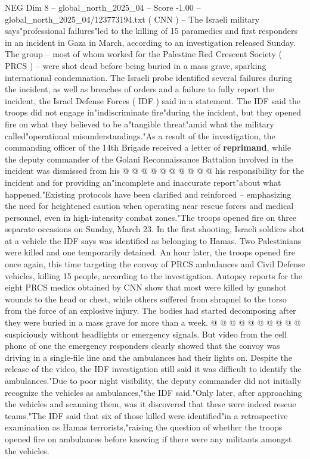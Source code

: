 \begin{textsample}{NEG Dim 8 – global\_north\_2025\_04 – Score -1.00 – global\_north\_2025\_04/123773194.txt}  \label{ex:f8_neg_423}
( CNN ) -- The Israeli military says"professional failures"led to the killing of 15 paramedics and first responders in an incident in Gaza in March, according to an investigation released Sunday.
The group -- most of whom worked for the Palestine Red Crescent Society ( PRCS ) -- were shot dead before being buried in a mass grave, sparking international condemnation.
The Israeli probe identified several failures during the incident, as well as breaches of orders and a failure to fully report the incident, the Israel Defense Forces ( IDF ) said in a statement.
The IDF said the troops did not engage in"indiscriminate fire"during the incident, but they opened fire on what they believed to be a"tangible threat"amid what the military called"operational misunderstandings."As a result of the investigation, the commanding officer of the 14th Brigade received a letter of \textbf{reprimand}, while the deputy commander of the Golani Reconnaissance Battalion involved in the incident was dismissed from his @ @ @ @ @ @ @ @ @ @ his responsibility for the incident and for providing an"incomplete and inaccurate report"about what happened."Existing protocols have been clarified and reinforced -- emphasizing the need for heightened caution when operating near rescue forces and medical personnel, even in high-intensity combat zones."The troops opened fire on three separate occasions on Sunday, March 23.
In the first shooting, Israeli soldiers shot at a vehicle the IDF says was identified as belonging to Hamas.
Two Palestinians were killed and one temporarily detained.
An hour later, the troops opened fire once again, this time targeting the convoy of PRCS ambulances and Civil Defense vehicles, killing 15 people, according to the investigation.
Autopsy reports for the eight PRCS medics obtained by CNN show that most were killed by gunshot wounds to the head or chest, while others suffered from shrapnel to the torso from the force of an explosive injury.
The bodies had started decomposing after they were buried in a mass grave for more than a week. @ @ @ @ @ @ @ @ @ @ suspiciously without headlights or emergency signals.
But video from the cell phone of one the emergency responders clearly showed that the convoy was driving in a single-file line and the ambulances had their lights on.
Despite the release of the video, the IDF investigation still said it was difficult to identify the ambulances."Due to poor night visibility, the deputy commander did not initially recognize the vehicles as ambulances,"the IDF said."Only later, after approaching the vehicles and scanning them, was it discovered that these were indeed rescue teams."The IDF said that six of those killed were identified"in a retrospective examination as Hamas terrorists,"raising the question of whether the troops opened fire on ambulances before knowing if there were any militants amongst the vehicles.

\end{textsample}
